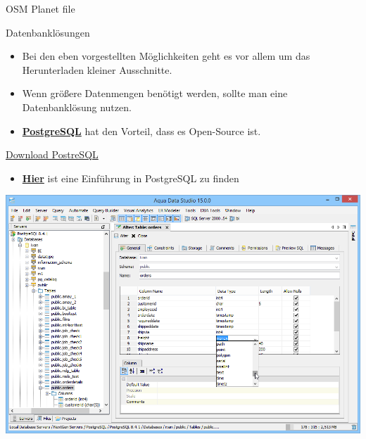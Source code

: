 \documentclass[ignorenonframetext,]{beamer}
\providecommand{\tightlist}{%
  \setlength{\itemsep}{0pt}\setlength{\parskip}{0pt}}
\begin{document}
\begin{frame}{OSM Planet file}
\protect\hypertarget{osm-planet-file}{}

\begin{block}{Datenbanklösungen}

\begin{itemize}
\tightlist
\item
  Bei den eben vorgestellten Möglichkeiten geht es vor allem um das
  Herunterladen kleiner Ausschnitte.
\item
  Wenn größere Datenmengen benötigt werden, sollte man eine
  Datenbanklösung nutzen.
\item
  \href{http://www.postgresql.org/}{\textbf{PostgreSQL}} hat den
  Vorteil, dass es Open-Source ist.
\end{itemize}

\end{block}

\end{frame}

\begin{frame}{\href{http://www.postgresql.org/download/windows/}{Download
PostreSQL}}
\protect\hypertarget{download-postresql}{}

\begin{itemize}
\tightlist
\item
  \href{https://datashenanigan.wordpress.com/2015/05/18/getting-started-with-postgresql-in-r/}{\textbf{Hier}}
  ist eine Einführung in PostgreSQL zu finden
\end{itemize}

\includegraphics{figure/aquadatastudio_postgresql_visual_table_editing.png}

\end{frame}
\end{document}
